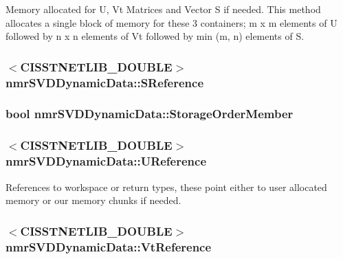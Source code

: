 Memory allocated for U, Vt Matrices and Vector S if needed. This method allocates a single block of memory for these 3 containers; m x m elements of U followed by n x n elements of Vt followed by min (m, n) elements of S. \hypertarget{classnmr_s_v_d_dynamic_data_a695e21e7e405283b5f16b9285c31d5eb}{
\subsubsection[{S\-Reference}]{$<$C\-I\-S\-S\-T\-N\-E\-T\-L\-I\-B\-\_\-\-D\-O\-U\-B\-L\-E$>$ nmr\-S\-V\-D\-Dynamic\-Data\-::\-S\-Reference\hspace{0.3cm}{\ttfamily [protected]}}}\label{classnmr_s_v_d_dynamic_data_a695e21e7e405283b5f16b9285c31d5eb}
\hypertarget{classnmr_s_v_d_dynamic_data_ad8bf7fcd150c906b3f7407b5a91fa51b}{
\subsubsection[{Storage\-Order\-Member}]{\setlength{\rightskip}{0pt plus 5cm}bool nmr\-S\-V\-D\-Dynamic\-Data\-::\-Storage\-Order\-Member\hspace{0.3cm}{\ttfamily [protected]}}}\label{classnmr_s_v_d_dynamic_data_ad8bf7fcd150c906b3f7407b5a91fa51b}
\hypertarget{classnmr_s_v_d_dynamic_data_a2f627a078f4bb1bc05c54f2e3269ae2c}{
\subsubsection[{U\-Reference}]{$<$C\-I\-S\-S\-T\-N\-E\-T\-L\-I\-B\-\_\-\-D\-O\-U\-B\-L\-E$>$ nmr\-S\-V\-D\-Dynamic\-Data\-::\-U\-Reference\hspace{0.3cm}{\ttfamily [protected]}}}\label{classnmr_s_v_d_dynamic_data_a2f627a078f4bb1bc05c54f2e3269ae2c}
References to workspace or return types, these point either to user allocated memory or our memory chunks if needed. \hypertarget{classnmr_s_v_d_dynamic_data_a55d8b13fe84f67743291578ce94578b0}{
\subsubsection[{Vt\-Reference}]{$<$C\-I\-S\-S\-T\-N\-E\-T\-L\-I\-B\-\_\-\-D\-O\-U\-B\-L\-E$>$ nmr\-S\-V\-D\-Dynamic\-Data\-::\-Vt\-Reference\hspace{0.3cm}{\ttfamily [protected]}}}\label{classnmr_s_v_d_dynamic_data_a55d8b13fe84f67743291578ce94578b0}
